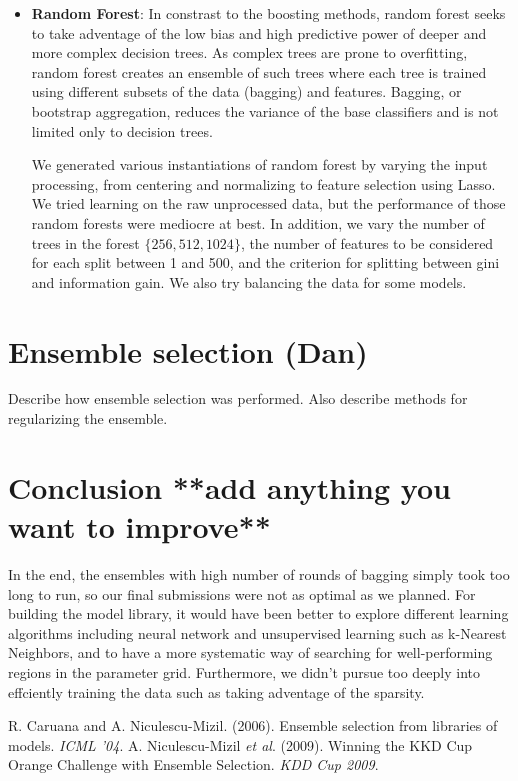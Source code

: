 \documentclass{article}
\renewcommand{\(}{\left(}
\renewcommand{\)}{\right)}
\begin{document}
\begin{itemize}
    \item \textbf{Random Forest}: In constrast to the boosting methods, random forest seeks to take adventage of the low bias and high predictive power of deeper and more complex decision trees.  As complex trees are prone to overfitting, random forest creates an ensemble of such trees where each tree is trained using different subsets of the data (bagging) and features. Bagging, or bootstrap aggregation, reduces the variance of the base classifiers and is not limited only to decision trees.    

      We generated various instantiations of random forest by varying the input processing, from centering and normalizing to feature selection using Lasso.  We tried learning on the raw unprocessed data, but the performance of those random forests were mediocre at best.  In addition, we vary the number of trees in the forest $\{256, 512, 1024\}$, the number of features to be considered for each split between 1 and 500, and the criterion for splitting between gini and information gain.  We also try balancing the data for some models.   
  \end{itemize}

\section{Ensemble selection (Dan)} \label{sec:ensemble}
Describe how ensemble selection was performed. Also describe methods for regularizing the ensemble. 

\section{Conclusion **add anything you want to improve**}
In the end, the ensembles with high number of rounds of bagging simply took too long to run, so our final submissions were not as optimal as we planned.  For building the model library, it would have been better to explore different learning algorithms including neural network and unsupervised learning such as k-Nearest Neighbors, and to have a more systematic way of searching for well-performing regions in the parameter grid.  Furthermore, we didn't pursue too deeply into effciently training the data such as taking adventage of the sparsity.  

\begin{thebibliography}{99}
  R. Caruana and A. Niculescu-Mizil.
  (2006).
  Ensemble selection from libraries of models.
  \emph{ICML '04}.
  A. Niculescu-Mizil \emph{et al}.
  (2009).
  Winning the KKD Cup Orange Challenge with Ensemble Selection.
  \emph{KDD Cup 2009}.

\end{thebibliography}
\end{document}

